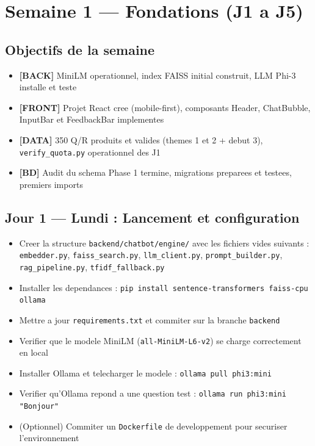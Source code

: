 \documentclass[11pt,a4paper]{article}
\newcommand{\back}{\textcolor{ragcolor}{\textbf{[BACK]}}}
\newcommand{\front}{\textcolor{reactcolor}{\textbf{[FRONT]}}}
\newcommand{\datas}{\textcolor{datacolor}{\textbf{[DATA]}}}
\newcommand{\db}{\textcolor{dbcolor}{\textbf{[BD]}}}
\begin{document}
\clearpage

\section{Semaine 1 --- Fondations (J1 a J5)}

\subsection*{Objectifs de la semaine}
\begin{itemize}
    \item \back{} MiniLM operationnel, index FAISS initial construit, LLM Phi-3 installe et teste
    \item \front{} Projet React cree (mobile-first), composants Header, ChatBubble, InputBar et FeedbackBar implementes
    \item \datas{} 350 Q/R produits et valides (themes 1 et 2 + debut 3), \texttt{verify\_quota.py} operationnel des J1
    \item \db{} Audit du schema Phase 1 termine, migrations preparees et testees, premiers imports
\end{itemize}

\subsection{Jour 1 --- Lundi : Lancement et configuration}

\begin{ragbox}[Backend --- J1]
\begin{itemize}
    \item[$\square$] Creer la structure \texttt{backend/chatbot/engine/} avec les fichiers vides suivants : \texttt{embedder.py}, \texttt{faiss\_search.py}, \texttt{llm\_client.py}, \texttt{prompt\_builder.py}, \texttt{rag\_pipeline.py}, \texttt{tfidf\_fallback.py}
    \item[$\square$] Installer les dependances : \texttt{pip install sentence-transformers faiss-cpu ollama}
    \item[$\square$] Mettre a jour \texttt{requirements.txt} et commiter sur la branche \texttt{backend}
    \item[$\square$] Verifier que le modele MiniLM (\texttt{all-MiniLM-L6-v2}) se charge correctement en local
    \item[$\square$] Installer Ollama et telecharger le modele : \texttt{ollama pull phi3:mini}
    \item[$\square$] Verifier qu'Ollama repond a une question test : \texttt{ollama run phi3:mini "Bonjour"}
    \item[$\square$] (Optionnel) Commiter un \texttt{Dockerfile} de developpement pour securiser l'environnement
\end{itemize}
\end{ragbox}
\end{document}
